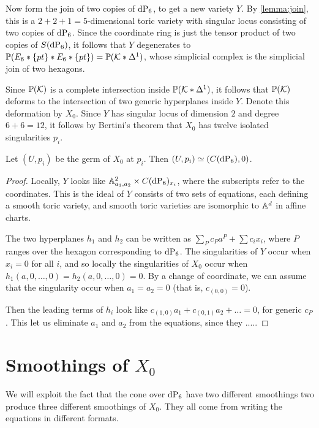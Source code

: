 Now form the join of two copies of $\dP6$, to get a new variety $Y$. By \cref{lemma:join}, this is a $2+2+1=5$-dimensional toric variety with singular locus consisting of two copies of $\dP6$. Since the coordinate ring is just the tensor product of two copies of $S(\dP6)$, it follows that $Y$ degenerates to $\mathbb{P}(E_6 \ast \{pt\} \ast E_6 \ast \{ pt \})=\mathbb{P}(\mathcal{K} \ast \Delta^1)$, whose simplicial complex is the simplicial join of two hexagons. 

Since $\mathbb{P}(\mathcal{K})$ is a complete intersection inside $\mathbb{P}(\mathcal{K} \ast \Delta^1)$,  it follows that $\mathbb{P}(\mathcal{K})$ deforms to the intersection of two generic hyperplanes inside $Y$. Denote this deformation by $X_0$. Since $Y$ has singular locus of dimension $2$ and degree $6+6=12$, it follows by Bertini's theorem that $X_0$ has twelve isolated singularities $p_i$.

\begin{lemma}
Let $(U,p_i)$ be the germ of $X_0$ at $p_i$. Then $(U,p_i) \simeq (C(\dP6),0)$.
\end{lemma}
\begin{proof}
Locally, $Y$ looks like $\A^2_{a_1,a_2} \times C(\dP6)_{x_i}$, where the subscripts refer to the coordinates. This is the ideal of $Y$ consists of two sets of equations, each defining a smooth toric variety, and smooth toric varieties are isomorphic to $\mathbb{A}^d$ in affine  charts.

The two hyperplanes $h_1$ and $h_2$ can be written as $\sum_P c_P a^P + \sum c_i x_i$, where $P$ ranges over the hexagon corresponding to $\dP6$. The singularities of $Y$ occur when $x_i=0$ for all $i$, and so locally the singularities of $X_0$ occur when $h_1(a,0,\ldots,0)=h_2(a,0,\ldots,0)=0$. By a change of coordinate, we can assume that the singularity occur when $a_1=a_2=0$ (that is, $c_{(0,0)}=0$). 

Then the leading terms of $h_i$ look like $c_{(1,0)}a_1+c_{(0,1)}a_2+\ldots=0$, for generic $c_P$. This let us eliminate $a_1$ and $a_2$ from the equations, since they .....
\end{proof}


\section[Smoothings of X0]{Smoothings of $X_0$}

We will exploit the fact that the cone over $\dP6$ have two different smoothings two produce three different smoothings of $X_0$. They all come from writing the equations in different formats.

